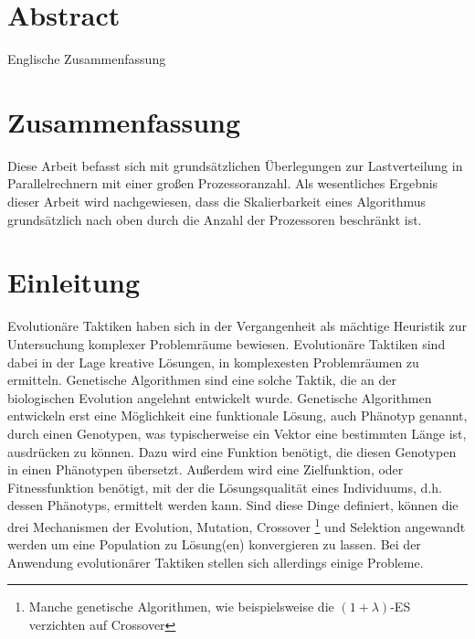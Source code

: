
\clearpage
\section*{Abstract}
Englische Zusammenfassung

\clearpage
\section*{Zusammenfassung}
Diese Arbeit befasst sich mit grundsätzlichen Überlegungen zur
Lastverteilung in Parallelrechnern mit einer großen
Prozessoranzahl. Als wesentliches Ergebnis dieser Arbeit wird
nachgewiesen, dass die Skalierbarkeit eines Algorithmus
grundsätzlich nach oben durch die Anzahl der Prozessoren beschränkt
ist.


\section{Einleitung}

Evolutionäre Taktiken haben sich in der Vergangenheit als mächtige Heuristik zur Untersuchung komplexer Problemräume bewiesen.
Evolutionäre Taktiken sind dabei in der Lage kreative Lösungen, in komplexesten Problemräumen zu ermitteln.
Genetische Algorithmen sind eine solche Taktik, die an der biologischen Evolution angelehnt entwickelt wurde.
Genetische Algorithmen entwickeln erst eine Möglichkeit eine funktionale Lösung, auch Phänotyp genannt, durch einen Genotypen, was typischerweise ein Vektor eine bestimmten Länge ist, ausdrücken zu können.
Dazu wird eine Funktion benötigt, die diesen Genotypen in einen Phänotypen übersetzt.
Außerdem wird eine Zielfunktion, oder Fitnessfunktion benötigt, mit der die Lösungsqualität eines Individuums, d.h. dessen Phänotyps, ermittelt werden kann.
Sind diese Dinge definiert, können die drei Mechanismen der Evolution, Mutation, Crossover
\footnote{Manche genetische Algorithmen, wie beispielsweise die $(1+\lambda)$-ES verzichten auf Crossover} und Selektion angewandt werden um eine Population zu Lösung(en) konvergieren zu lassen.
Bei der Anwendung evolutionärer Taktiken stellen sich allerdings einige Probleme.

